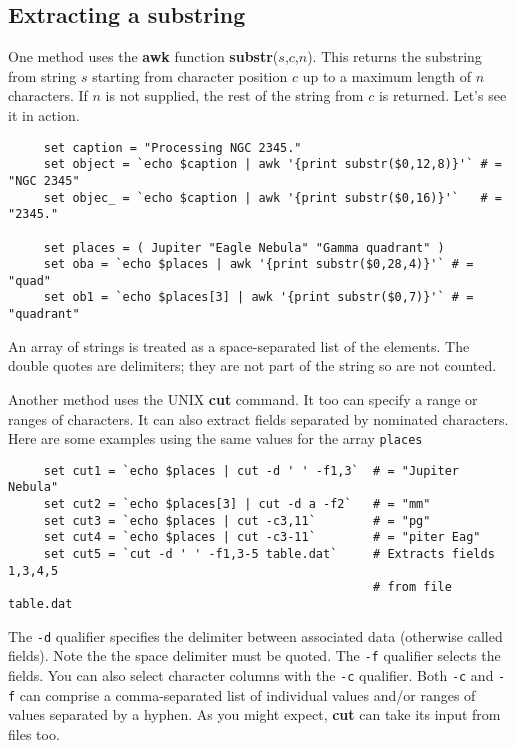 \documentclass[twoside,11pt]{article}
\newcommand{\xlabel}[1]{}
\begin{document}
\newpage
\subsection{\xlabel{sc4_se_string_ex_substr}Extracting a substring
\label{sc4_se_string_ex_substr}}

One method uses the {\bf awk} function {\bf substr}($s$,$c$,$n$).  This
returns the substring from string $s$ starting from character position
$c$ up to a maximum length of $n$ characters.  If $n$ is not supplied,
the rest of the string from $c$ is returned.  Let's see it in action.

\small
\begin{verbatim}
     set caption = "Processing NGC 2345."
     set object = `echo $caption | awk '{print substr($0,12,8)}'` # = "NGC 2345"
     set objec_ = `echo $caption | awk '{print substr($0,16)}'`   # = "2345."

     set places = ( Jupiter "Eagle Nebula" "Gamma quadrant" )
     set oba = `echo $places | awk '{print substr($0,28,4)}'` # = "quad"
     set ob1 = `echo $places[3] | awk '{print substr($0,7)}'` # = "quadrant"
\end{verbatim}
\normalsize
An array of strings is treated as a space-separated list of the elements.
The double quotes are delimiters; they are not part of the string so
are not counted.

Another method uses the UNIX {\bf cut} command.  It too can specify a
range or ranges of characters.  It can also extract fields separated
by nominated characters.  Here are some examples using the same values
for the array {\tt places}

\small
\begin{verbatim}
     set cut1 = `echo $places | cut -d ' ' -f1,3`  # = "Jupiter Nebula"
     set cut2 = `echo $places[3] | cut -d a -f2`   # = "mm"
     set cut3 = `echo $places | cut -c3,11`        # = "pg"
     set cut4 = `echo $places | cut -c3-11`        # = "piter Eag"
     set cut5 = `cut -d ' ' -f1,3-5 table.dat`     # Extracts fields 1,3,4,5
                                                   # from file table.dat

\end{verbatim}
\normalsize

The {\tt -d} qualifier specifies the delimiter between associated data
(otherwise called fields).  Note the the space delimiter must be quoted.
The {\tt -f} qualifier selects the fields.  You can also select
character columns with the {\tt -c} qualifier.  Both {\tt -c} and
{\tt -f} can comprise a comma-separated list of individual values and/or
ranges of values separated by a hyphen.  As you might expect,
{\bf cut} can take its input from files too.
\end{document}
